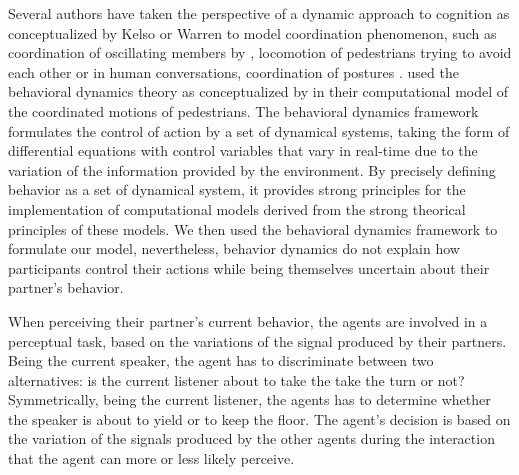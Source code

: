 Several authors have taken the perspective of a dynamic approach to cognition as conceptualized by Kelso \cite{kelso_coordination_2009} or Warren \citep{warren_dynamics_2006} to model coordination phenomenon, such as coordination of oscillating
members by \citep{haken_theoretical_1985}, locomotion of pedestrians trying to avoid each other \citep{rio_follow_2014} or in human conversations, coordination of postures \citep{fowler_language_2008} .
\citep{rio_follow_2014} used the behavioral dynamics theory as conceptualized by \citep{warren_dynamics_2006} in their computational model of the coordinated motions of pedestrians. The behavioral dynamics framework formulates the control of action by a set of dynamical systems, taking the form of differential equations with control variables that vary in real-time due to the variation of the information provided by the environment.
By precisely defining behavior as a set of
dynamical system, it provides strong principles for the
implementation of computational models derived from the strong theorical principles of these models. 
We then used the behavioral dynamics framework to formulate our model, nevertheless, behavior dynamics do not explain how participants control their actions while being themselves uncertain about their partner's behavior. 

When perceiving their partner's current behavior, the agents are involved in a perceptual task, based on the variations of the signal produced by their partners. Being the current speaker, the agent has to discriminate between two alternatives: is the current listener about to take the take the turn or not? Symmetrically, being the current listener, the agents has to determine whether the speaker is about to yield or to keep the floor. The agent's decision is based on the variation of the signals produced by the other agents during the interaction that the agent can more or less likely perceive.

